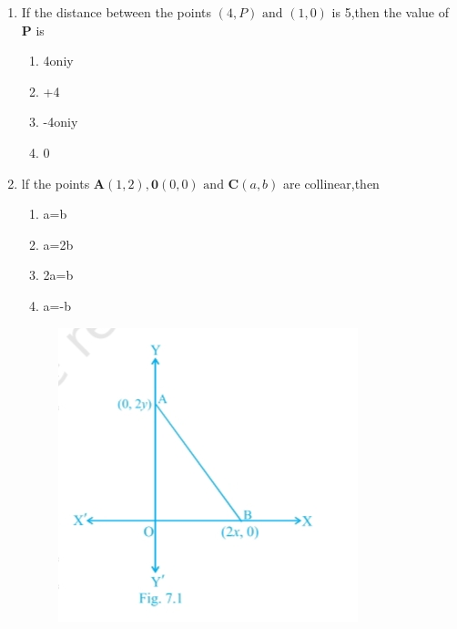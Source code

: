 \documentclass[12pt]{article}
\let\vec\mathbf
\begin{document}
\begin{enumerate}
\begin{enumerate}
\end{enumerate}
\item If the distance between the points $(4,P) \text{ and } (1,0)$ is 5,then the value of $\vec{P}$ is
\begin{enumerate} 
\item4oniy
\item+4
\item-4oniy
\item0
\end{enumerate}
\item lf the points $\vec{A}(1,2),\vec{0}(0,0)\text{ and }\vec{C}(a,b)$ are collinear,then
\begin{enumerate}
\item a=b
\item a=2b
\item 2a=b
\item a=-b
\end{enumerate}
\begin{figure}[h!]
  \centering
  \includegraphics[width=\columnwidth]{./figs/image.jpg}
  \caption{}
\label{fig:10/7/12Fig1}
\end{figure}

	\end{enumerate}
	
\end{document}
